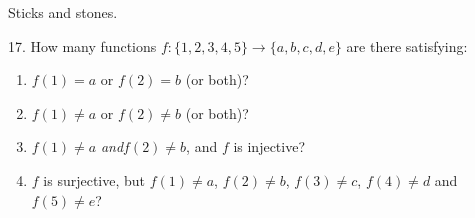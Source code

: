 \documentclass[10pt,]{book}
\theoremstyle{plain}
\theoremstyle{definition}
\numberwithin{equation}{chapter}
\begin{document}
\begin{exerciselist}
          Sticks and stones.
        \item[17.]\hypertarget{exercise-136}{}
            How many functions \(f: \{1,2,3,4,5\} \to \{a,b,c,d,e\}\) are there satisfying:
          \leavevmode%
\begin{enumerate}[label=(\alph*)]
\item\hypertarget{li-460}{}\(f(1) = a\) or \(f(2) = b\) (or both)?%
\item\hypertarget{li-461}{}\(f(1) \ne a\) or \(f(2) \ne b\) (or both)?%
\item\hypertarget{li-462}{}\(f(1) \ne a\)\emph{ and}\(f(2) \ne b\), and \(f\) is injective?%
\item\hypertarget{li-463}{}
                \(f\) is surjective, but \(f(1) \ne a\), \(f(2) \ne b\), \(f(3) \ne c\), \(f(4) \ne d\) and \(f(5) \ne e\)?
\end{enumerate}


\end{exerciselist}
\end{document}
